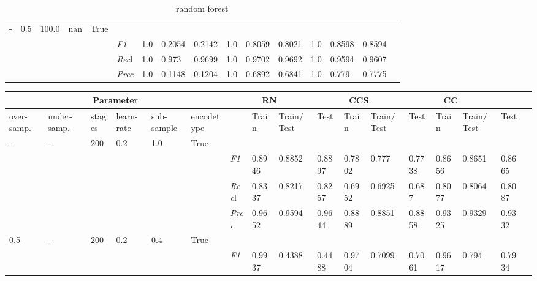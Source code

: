 \begin{table}[]
\begin{tabularx}{\textwidth}{XXXXX|X|XXX|XXX|XXXX}
    - & 0.5 & 100.0 & nan & True& & & & & & & & & \\
    & & & & & \textit{F1} & 1.0 & 0.2054 & 0.2142 & 1.0 & 0.8059        & 0.8021        & 1.0        & 0.8598        & 0.8594        \\
    & & & & & \textit{Rec}l & 1.0 & 0.973 & 0.9699    & 1.0 & 0.9702    & 0.9692    & 1.0    & 0.9594    & 0.9607    \\
    & & & & & \textit{Prec} & 1.0 & 0.1148 & 0.1204 & 1.0 & 0.6892 & 0.6841 & 1.0 & 0.779 & 0.7775 \\ \midrule
    \end{tabularx}
    \caption{random forest}
    \label{tab:all_results_random_forest}
    \end{table}
    
    \begin{table}[]
    \tiny
    \tabcolsep=0.11cm
    \begin{tabularx}{\textwidth}{XXXXXX|X|XXX|XXX|XXXX}
    \toprule
    \multicolumn{6}{c}{Parameter} & \multicolumn{3}{c}{RN} & \multicolumn{3}{c}{CCS} & \multicolumn{3}{c}{CC} \\ \midrule
    over-\newline samp. & under-\newline samp. & stages &learn-\newline rate & sub-\newline sample & encode\newline type & & Train & Train/\newline Test & Test & Train & Train/\newline Test & Test & Train & Train/\newline Test & Test \\ \midrule
    - & - & 200 & 0.2 & 1.0 &True & & & & & & & & & \\
    & & & & & & \textit{F1} & 0.8946 & 0.8852 & 0.8897 & 0.7802 & 0.777        & 0.7738        & 0.8656        & 0.8651        & 0.8665        \\
    & & & & & & \textit{Rec}l & 0.8337 & 0.8217 & 0.8257    & 0.6952 & 0.6925    & 0.687    & 0.8077    & 0.8064    & 0.8087    \\
    & & & & & & \textit{Prec} & 0.9652 & 0.9594 & 0.9644 & 0.8889 & 0.8851 & 0.8858 & 0.9325 & 0.9329 & 0.9332 \\ \midrule
    0.5 & - & 200 & 0.2 & 0.4 &True & & & & & & & & & \\
    & & & & & & \textit{F1} & 0.9937 & 0.4388 & 0.4488 & 0.9704 & 0.7099        & 0.7061        & 0.9617        & 0.794        & 0.7934        \\

\end{tabularx}
\end{table}
